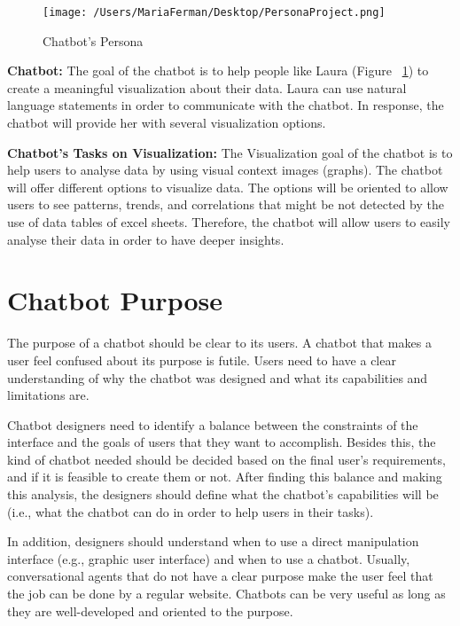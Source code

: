 \documentclass[a4paper,10pt]{article}
\begin{document}
\begin{figure}
\centering
\texttt{[image: /Users/MariaFerman/Desktop/PersonaProject.png]}
\caption{Chatbot's Persona}
\label{FigureLaura}
\end{figure}

\textbf{Chatbot:} The goal of the chatbot is to help people like Laura (Figure ~\ref{FigureLaura}) to create a meaningful visualization about their data. Laura can use natural language statements in order to communicate with the chatbot. In response, the chatbot will provide her with several visualization options.

\textbf{Chatbot's Tasks on Visualization:} The Visualization goal of the chatbot is to help users to analyse data by using visual context images (graphs). The chatbot will offer different options to visualize data. The options will be oriented to allow users to see patterns, trends, and correlations that might be not detected by the use of data tables of excel sheets. Therefore, the chatbot will allow users to easily analyse their data in order to have deeper insights.  

\section{Chatbot Purpose}

The purpose of a chatbot should be clear to its users. A chatbot that makes a user feel confused about its purpose is futile. Users need to have a clear understanding of why the chatbot was designed and what its capabilities and limitations are.

Chatbot designers need to identify a balance between the constraints of the interface and the goals of users that they want to accomplish. Besides this, the kind of chatbot needed should be decided based on the final user's requirements, and if it is feasible to create them or not. After finding this balance and making this analysis, the designers should define what the chatbot's capabilities will be (i.e., what the chatbot can do in order to help users in their tasks). 

In addition, designers should understand when to use a direct manipulation interface (e.g., graphic user interface) and when to use a chatbot. Usually, conversational agents that do not have a clear purpose make the user feel that the job can be done by a regular website. Chatbots can be very useful as long as they are well-developed and oriented to the purpose. %
\end{document}
